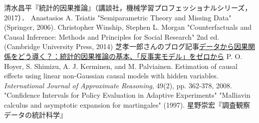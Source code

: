 \documentclass[uplatex,dvipdfmx]{jsreport}
\begin{document}
\begin{thebibliography}{99}
    清水昌平『統計的因果推論』（講談社，機械学習プロフェッショナルシリーズ，2017）．
    Anastasios A. Tsiatis "Semiparametric Theory and Missing Data" (Springer, 2006).
    Christopher Winship, Stephen L. Morgan "Counterfactuals and Causal Inference: Methods and Principles for Social Research" 2nd ed. (Cambridge University Press, 2014)
    芝孝一郎さんのブログ記事\href{https://www.krsk-phs.com/entry/counterfactual_assumptions}{データから因果関係をどう導く？：統計的因果推論の基本、「反事実モデル」をゼロから}
    P. O. Hoyer, S. Shimizu, A. J. Kerminen, and M. Palviainen. Estimation of causal effects using linear non-Gaussian causal models with hidden variables. \textit{International Journal of Approximate Reasoning}, 49(2), pp. 362-378, 2008.
    "Confidence Intervals for Policy Evaluation in Adaptive Experiments"
    "Malliavin calculus and asymptotic expansion for martingales" (1997).
    星野崇宏『調査観察データの統計科学』
\end{thebibliography}
\end{document}
